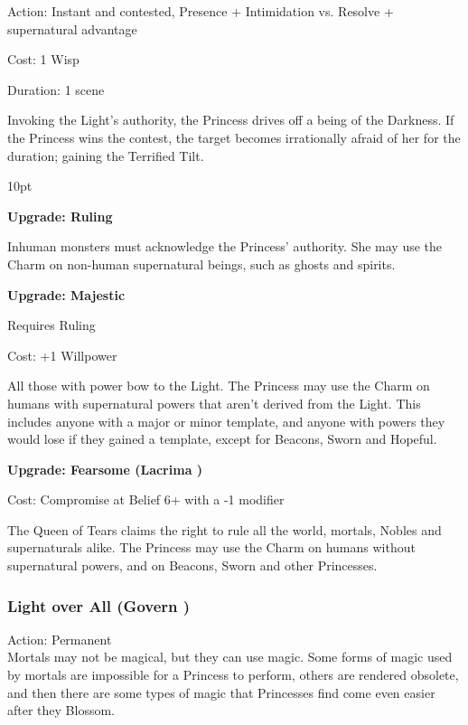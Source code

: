 \noindent Action: Instant and contested, Presence + Intimidation vs. Resolve + supernatural advantage

\noindent Cost: 1 Wisp

\noindent Duration: 1 scene

\noindent Invoking the Light's authority, the Princess drives off a being of the Darkness. If the Princess wins the contest, the target becomes irrationally afraid of her for the duration; gaining the Terrified Tilt.

\begin{myindentpar}{10pt}

\textbf{Upgrade: Ruling}

Inhuman monsters must acknowledge the Princess' authority. She may use the Charm on non-human supernatural beings, such as ghosts and spirits.

\textbf{Upgrade: Majestic}

Requires Ruling

\noindent Cost: +1 Willpower

All those with power bow to the Light. The Princess may use the Charm on humans with supernatural powers that aren't derived from the Light. This includes anyone with a major or minor template, and anyone with powers they would lose if they gained a template, except for Beacons, Sworn and Hopeful.

\textbf{Upgrade: Fearsome (Lacrima \textbullet\textbullet)}

\noindent Cost: Compromise at Belief 6+ with a -1 modifier

The Queen of Tears claims the right to rule all the world, mortals, Nobles and supernaturals alike. The Princess may use the Charm on humans without supernatural powers, and on Beacons, Sworn and other Princesses.\end{myindentpar}



\subsubsection*{Light over All (Govern \textbullet\textbullet)}

\noindent Action: Permanent \\

\noindent Mortals may not be magical, but they can use magic. Some forms of magic used by mortals are impossible for a Princess to perform, others are rendered obsolete, and then there are some types of magic that Princesses find come even easier after they Blossom. 

